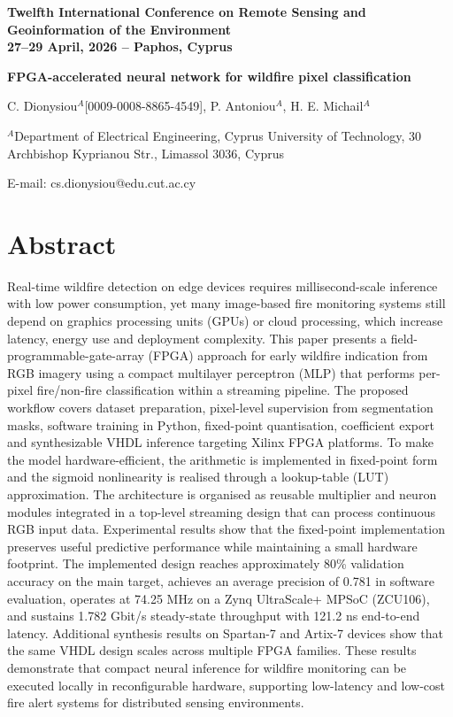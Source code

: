 \documentclass[11pt,a4paper]{article}
\begin{document}
{\bfseries Twelfth International Conference on Remote Sensing and Geoinformation of the Environment\\
27--29 April, 2026 -- Paphos, Cyprus\par}

\vspace{1.2em}

{\LARGE\bfseries FPGA-accelerated neural network for wildfire pixel classification\par}

\vspace{0.8em}

{\large C. Dionysiou$^{A}$[0009-0008-8865-4549], P. Antoniou$^{A}$, H. E. Michail$^{A}$\par}
{\normalsize $^{A}$Department of Electrical Engineering, Cyprus University of Technology, 30 Archbishop Kyprianou Str., Limassol 3036, Cyprus\par}
{\normalsize E-mail: cs.dionysiou@edu.cut.ac.cy\par}

\section*{Abstract}

Real-time wildfire detection on edge devices requires millisecond-scale inference with low power consumption, yet many image-based fire monitoring systems still depend on graphics processing units (GPUs) or cloud processing, which increase latency, energy use and deployment complexity. This paper presents a field-programmable-gate-array (FPGA) approach for early wildfire indication from RGB imagery using a compact multilayer perceptron (MLP) that performs per-pixel fire/non-fire classification within a streaming pipeline. The proposed workflow covers dataset preparation, pixel-level supervision from segmentation masks, software training in Python, fixed-point quantisation, coefficient export and synthesizable VHDL inference targeting Xilinx FPGA platforms. To make the model hardware-efficient, the arithmetic is implemented in fixed-point form and the sigmoid nonlinearity is realised through a lookup-table (LUT) approximation. The architecture is organised as reusable multiplier and neuron modules integrated in a top-level streaming design that can process continuous RGB input data. Experimental results show that the fixed-point implementation preserves useful predictive performance while maintaining a small hardware footprint. The implemented design reaches approximately 80\% validation accuracy on the main target, achieves an average precision of 0.781 in software evaluation, operates at 74.25 MHz on a Zynq UltraScale+ MPSoC (ZCU106), and sustains 1.782 Gbit/s steady-state throughput with 121.2 ns end-to-end latency. Additional synthesis results on Spartan-7 and Artix-7 devices show that the same VHDL design scales across multiple FPGA families. These results demonstrate that compact neural inference for wildfire monitoring can be executed locally in reconfigurable hardware, supporting low-latency and low-cost fire alert systems for distributed sensing environments.
\end{document}

